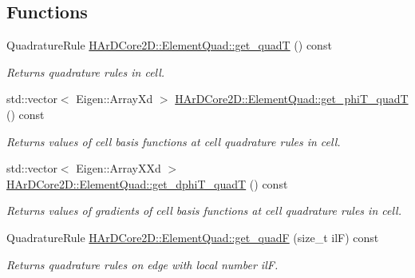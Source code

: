 \subsection*{Functions}
\begin{DoxyCompactItemize}
\item 
\mbox{\label{group__HybridCore_ga16951d0e488060237fbb5eee3c5194b2}} 
Quadrature\+Rule \hyperlink{group__HybridCore_ga16951d0e488060237fbb5eee3c5194b2}{H\+Ar\+D\+Core2\+D\+::\+Element\+Quad\+::get\+\_\+quadT} () const
\begin{DoxyCompactList}\small\item\em Returns quadrature rules in cell. \end{DoxyCompactList}\item 
\mbox{\label{group__HybridCore_ga0cde817c1cf12e839c3f195aa02498ba}} 
std\+::vector$<$ Eigen\+::\+Array\+Xd $>$ \hyperlink{group__HybridCore_ga0cde817c1cf12e839c3f195aa02498ba}{H\+Ar\+D\+Core2\+D\+::\+Element\+Quad\+::get\+\_\+phi\+T\+\_\+quadT} () const
\begin{DoxyCompactList}\small\item\em Returns values of cell basis functions at cell quadrature rules in cell. \end{DoxyCompactList}\item 
\mbox{\label{group__HybridCore_gae8e43d7a9a64a009690c4890534e6549}} 
std\+::vector$<$ Eigen\+::\+Array\+X\+Xd $>$ \hyperlink{group__HybridCore_gae8e43d7a9a64a009690c4890534e6549}{H\+Ar\+D\+Core2\+D\+::\+Element\+Quad\+::get\+\_\+dphi\+T\+\_\+quadT} () const
\begin{DoxyCompactList}\small\item\em Returns values of gradients of cell basis functions at cell quadrature rules in cell. \end{DoxyCompactList}\item 
\mbox{\label{group__HybridCore_gaa90e88daa7803576aaeb9edc3574e935}} 
Quadrature\+Rule \hyperlink{group__HybridCore_gaa90e88daa7803576aaeb9edc3574e935}{H\+Ar\+D\+Core2\+D\+::\+Element\+Quad\+::get\+\_\+quadF} (size\+\_\+t ilF) const
\begin{DoxyCompactList}\small\item\em Returns quadrature rules on edge with local number ilF. \end{DoxyCompactList}\item 

\end{DoxyCompactItemize}
